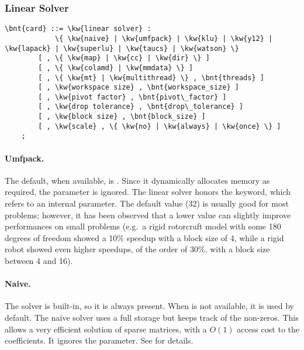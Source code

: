 \subsubsection{Linear Solver}   
\label{sec:LINEAR-SOLVER}
\begin{Verbatim}[commandchars=\\\{\}]
    \bnt{card} ::= \kw{linear solver} :
            \{ \kw{naive} | \kw{umfpack} | \kw{klu} | \kw{y12} | \kw{lapack} | \kw{superlu} | \kw{taucs} | \kw{watson} \}
        [ , \{ \kw{map} | \kw{cc} | \kw{dir} \} ]
        [ , \{ \kw{colamd} | \kw{mmdata} \} ]
        [ , \{ \kw{mt} | \kw{multithread} \} , \bnt{threads} ]
        [ , \kw{workspace size} , \bnt{workspace_size} ] 
        [ , \kw{pivot factor} , \bnt{pivot\_factor} ]
        [ , \kw{drop tolerance} , \bnt{drop\_tolerance} ]
        [ , \kw{block size} , \bnt{block_size} ]
        [ , \kw{scale} , \{ \kw{no} | \kw{always} | \kw{once} \} ]
    ;
\end{Verbatim}

\paragraph{Umfpack.}
The default, when available, is .
Since it dynamically allocates memory as required, the  
parameter is ignored.
The  linear solver honors the  keyword,
which refers to an internal parameter.
The default value (32) is usually good for most problems; however,
it has been observed that a lower value can slightly improve
performances on small problems (e.g.\ a rigid rotorcraft model
with some 180 degrees of freedom showed a 10\% speedup with 
a block size of 4, while a rigid robot showed even higher speedups,
of the order of 30\%, with a block size between 4 and 16).

\paragraph{Naive.}
The  solver is built-in, so it is always present.
When  is not available, it is used by default.
The naive solver uses a full storage but keeps track of the non-zeros.
This allows a very efficient solution of sparse matrices, with
a $O(1)$ access cost to the coefficients.
It ignores the  parameter.
See \cite{NAIVE-2007} for details.

